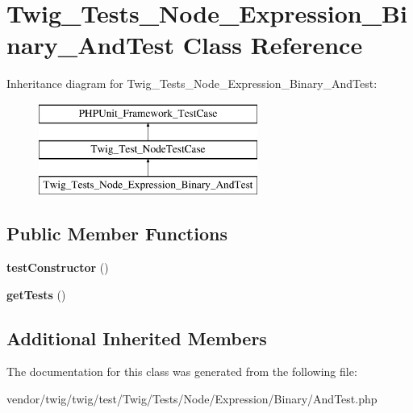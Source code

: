 \hypertarget{classTwig__Tests__Node__Expression__Binary__AndTest}{}\section{Twig\+\_\+\+Tests\+\_\+\+Node\+\_\+\+Expression\+\_\+\+Binary\+\_\+\+And\+Test Class Reference}
\label{classTwig__Tests__Node__Expression__Binary__AndTest}
Inheritance diagram for Twig\+\_\+\+Tests\+\_\+\+Node\+\_\+\+Expression\+\_\+\+Binary\+\_\+\+And\+Test\+:\begin{figure}[H]
\begin{center}
\leavevmode
\includegraphics[height=3.000000cm]{classTwig__Tests__Node__Expression__Binary__AndTest}
\end{center}
\end{figure}
\subsection*{Public Member Functions}
\begin{DoxyCompactItemize}
\item 
{\bfseries test\+Constructor} ()\hypertarget{classTwig__Tests__Node__Expression__Binary__AndTest_aad7fc972e5cad86f613b937da3e306f1}{}\label{classTwig__Tests__Node__Expression__Binary__AndTest_aad7fc972e5cad86f613b937da3e306f1}

\item 
{\bfseries get\+Tests} ()\hypertarget{classTwig__Tests__Node__Expression__Binary__AndTest_a380c1f1d25783f58609537d54365d8b7}{}\label{classTwig__Tests__Node__Expression__Binary__AndTest_a380c1f1d25783f58609537d54365d8b7}

\end{DoxyCompactItemize}
\subsection*{Additional Inherited Members}


The documentation for this class was generated from the following file\+:\begin{DoxyCompactItemize}
\item 
vendor/twig/twig/test/\+Twig/\+Tests/\+Node/\+Expression/\+Binary/And\+Test.\+php\end{DoxyCompactItemize}
